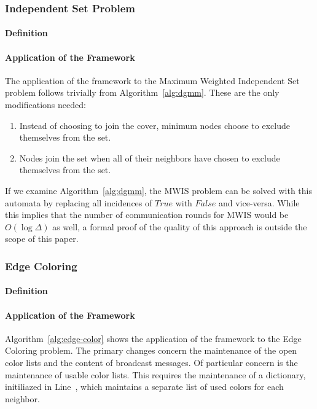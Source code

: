\documentclass[conference, 10pt, letter]{IEEEtran}
\begin{document}
\subsubsection{Independent Set Problem}
\label{ssb:algorithms-other-is}
\paragraph{Definition}

\paragraph{Application of the Framework}

The application of the framework to the Maximum Weighted Independent Set problem follows trivially from Algorithm~\ref{alg:dgmm}. These are the only modifications needed:

\begin{enumerate}
\item Instead of choosing to join the cover, minimum nodes choose to exclude themselves from the set.
\item Nodes join the set when all of their neighbors have chosen to exclude themselves from the set.\label{en:modlist-lastline}
\end{enumerate}

If we examine Algorithm~\ref{alg:dgmm}, the MWIS problem can be solved with this automata by replacing all incidences of $True$ with $False$ and vice-versa. While this implies that the number of communication rounds for MWIS would be $O(\log \Delta)$ as well, a formal proof of the quality of this approach is outside the scope of this paper.

\subsubsection{Edge Coloring}
\label{ssb:algorithms-other-ec}
\paragraph{Definition}

\paragraph{Application of the Framework}
\label{par:apply-edge-color}

Algorithm~\ref{alg:edge-color} shows the application of the framework to the Edge Coloring problem. The primary changes concern the maintenance of the open color lists and the content of broadcast messages. Of particular concern is the maintenance of usable color lists. This requires the maintenance of a dictionary, initiliazed in Line~, which maintains a separate list of used colors for each neighbor.
\end{document}
